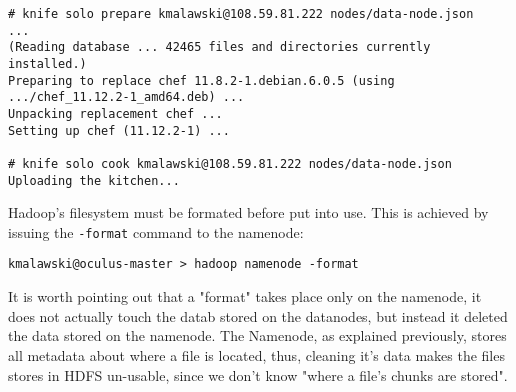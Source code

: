 \begin{lstlisting}[caption={Preparing and Cooking a server with in order to prepare it for becoming a Hadoop data-node},label={lst:cheffing-data-node}]
# knife solo prepare kmalawski@108.59.81.222 nodes/data-node.json
...
(Reading database ... 42465 files and directories currently installed.)
Preparing to replace chef 11.8.2-1.debian.6.0.5 (using .../chef_11.12.2-1_amd64.deb) ...
Unpacking replacement chef ...
Setting up chef (11.12.2-1) ...

# knife solo cook kmalawski@108.59.81.222 nodes/data-node.json
Uploading the kitchen...

\end{lstlisting}






Hadoop's filesystem must be formated before put into use. This is achieved by issuing the \verb|-format| command to the namenode:

\begin{verbatim}
kmalawski@oculus-master > hadoop namenode -format
\end{verbatim}

It is worth pointing out that a "format" takes place only on the namenode, it does not actually touch the datab stored on the datanodes,
but instead it deleted the data stored on the namenode. The Namenode, as explained previously, stores all metadata about where a file is located,
thus, cleaning it's data makes the files stores in HDFS un-usable, since we don't know "where a file's chunks are stored".